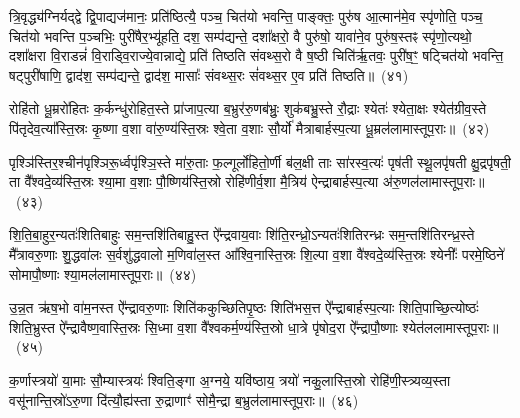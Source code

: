 त्रि॒वृद्ध्य॑ग्निर्यद्द्वे द्वि॒पाद्यज॑मानः॒ प्रति॑ष्ठित्यै॒ पञ्च॒ चित॑यो भवन्ति॒ पाङ्क्तः॒ पुरु॑ष आ॒त्मान॑मे॒व स्पृ॑णोति॒ पञ्च॒ चित॑यो भवन्ति प॒ञ्चभिः॒ पुरी॑षैर॒भ्यू॑हति॒ दश॒ सम्प॑द्यन्ते॒ दशा᳚क्षरो॒ वै पुरु॑षो॒ यावा॑ने॒व पुरु॑ष॒स्तꣴ स्पृ॑णो॒त्यथो॒ दशा᳚क्षरा वि॒राडन्नं॑ वि॒राड्वि॒राज्ये॒वान्नाद्ये॒ प्रति॑ तिष्ठति संवथ्स॒रो वै ष॒ष्ठी चिति॑र्\mbox{}ऋ॒तवः॒ पुरी॑ष॒ꣳ॒ षट्चित॑यो भवन्ति॒ षट्पुरी॑षाणि॒ द्वाद॑श॒ सम्प॑द्यन्ते॒ द्वाद॑श॒ मासाः᳚ संवथ्स॒रः सं॑वथ्स॒र ए॒व प्रति॑ तिष्ठति॥~(४१)

{\anuvakamend[{अव॒ चित॑यः॒ पुरी॑षं॒ पञ्च॑दश च}]}%

रोहि॑तो धू॒म्ररो॑हितः क॒र्कन्धु॑रोहित॒स्ते प्रा॑जाप॒त्या ब॒भ्रुर॑रु॒णब॑भ्रुः॒ शुक॑बभ्रु॒स्ते रौ॒द्राः श्येतः॑ श्येता॒क्षः श्येत॑ग्रीव॒स्ते पि॑तृदेव॒त्या᳚स्ति॒स्रः कृ॒ष्णा व॒शा वा॑रु॒ण्य॑स्ति॒स्रः श्वे॒ता व॒शाः सौ॒र्यो॑ मैत्राबार्\mbox{}हस्प॒त्या धू॒म्रल॑लामास्तूप॒राः॥~(४२)

{\anuvakamend[{}]}%

पृश्ञि॑स्तिर॒श्चीन॑पृश्ञिरू॒र्ध्वपृ॑श्ञि॒स्ते मा॑रु॒ताः फ॒ल्गूर्लो॑हितो॒र्णी ब॑ल॒क्षी ताः सा॑रस्व॒त्यः॑ पृष॑ती स्थू॒लपृ॑षती क्षु॒द्रपृ॑षती॒ ता वै᳚श्वदे॒व्य॑स्ति॒स्रः श्या॒मा व॒शाः पौ॒ष्णिय॑स्ति॒स्रो रोहि॑णीर्व॒शा मै॒त्रिय॑ ऐन्द्राबार्\mbox{}हस्प॒त्या अ॑रु॒णल॑लामास्तूप॒राः॥~(४३)

{\anuvakamend[{रोहि॑तः॒ पृश्ञिः॒ षड्विꣳ॑शतिः॒ षड्विꣳ॑शतिः}]}%

शि॒ति॒बा॒हुर॒न्यतः॑शितिबाहुः सम॒न्तशि॑तिबाहु॒स्त ऐ᳚न्द्रवाय॒वाः शि॑ति॒रन्ध्रो॒\-ऽन्यतः॑शितिरन्ध्रः सम॒न्तशि॑तिरन्ध्र॒स्ते मै᳚त्रावरु॒णाः शु॒द्धवा॑लः स॒र्वशु॑द्धवालो म॒णिवा॑ल॒स्त आ᳚श्वि॒नास्ति॒स्रः शि॒ल्पा व॒शा वै॑श्वदे॒व्य॑स्ति॒स्रः श्येनीः᳚ परमे॒ष्ठिने॑ सोमापौ॒ष्णाः श्या॒मल॑लामास्तूप॒राः॥~(४४)

{\anuvakamend[{}]}%

उ॒न्न॒त ऋ॑ष॒भो वा॑म॒नस्त ऐ᳚न्द्रावरु॒णाः शिति॑ककुच्छितिपृ॒ष्ठः शिति॑भस॒त्त ऐ᳚न्द्राबार्\mbox{}हस्प॒त्याः शिति॒पाच्छि॒त्योष्ठः॑ शिति॒भ्रुस्त ऐ᳚न्द्रावैष्ण॒वास्ति॒स्रः सि॒ध्मा व॒शा वै᳚श्वकर्म॒ण्य॑स्ति॒स्रो धा॒त्रे पृ॑षोद॒रा ऐ᳚न्द्रापौ॒ष्णाः श्येत॑ललामास्तूप॒राः॥~(४५)

{}%

क॒र्णास्त्रयो॑ या॒माः सौ॒म्यास्त्रयः॑ श्विति॒ङ्गा अ॒ग्नये॒ यवि॑ष्ठाय॒ त्रयो॑ नकु॒लास्ति॒स्रो रोहि॑णी॒स्त्र्यव्य॒स्ता वसू॑नान्ति॒स्रो॑\-ऽरु॒णा दि॑त्यौ॒ह्य॑स्ता रु॒द्राणाꣳ॑ सोमै॒न्द्रा ब॒भ्रुल॑लामास्तूप॒राः॥~(४६)

